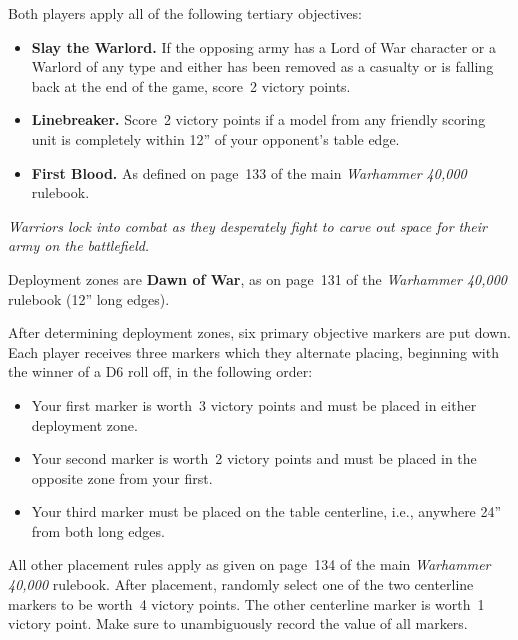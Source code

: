   Both players apply all of
the following tertiary objectives:

\begin{itemize}
\item \textbf{Slay the Warlord.}  If the opposing army has a Lord of
  War character or a Warlord of any type and either has been removed
  as a casualty or is falling back at the end of the game, score~2
  victory points.

\item \textbf{Linebreaker.}  Score~2 victory points if a model from
  any friendly scoring unit is completely within 12'' of your
  opponent's table edge.

\item \textbf{First Blood.}  As defined on page~133 of the main
  \emph{Warhammer 40,000} rulebook.
\end{itemize}



\centerline{\emph{Warriors lock into combat as they desperately fight
    to carve out space for their army on the battlefield.}}


Deployment zones are \textbf{Dawn of War}, as on page~131 of the
\emph{Warhammer 40,000} rulebook (12'' long edges).

\bigskip%
After determining deployment zones, six primary objective markers are
put down.  Each player receives three markers which they alternate
placing, beginning with the winner of a D6 roll off, in the following
order:

\begin{itemize}
\item Your first marker is worth~3 victory points and must be placed
  in either deployment zone.

\item Your second marker is worth~2 victory points and must be placed
  in the opposite zone from your first.

\item Your third marker must be placed on the table centerline, i.e.,
  anywhere 24'' from both long edges.
\end{itemize}

All other placement rules apply as given on page~134 of the main
\emph{Warhammer 40,000} rulebook.  After placement, randomly select
one of the two centerline markers to be worth~4 victory points.  The
other centerline marker is worth~1 victory point.  Make sure to
unambiguously record the value of all markers.


